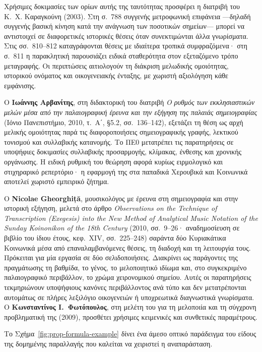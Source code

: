 \documentclass[11pt,a4paper]{article}
\begin{document}
Χρήσιμες δοκιμασίες των ορίων αυτής της ταυτότητας προσφέρει η διατριβή του Κ.~Χ. Καραγκούνη (2003). Στη σ.~788 συγγενής μετροφωνική επιφάνεια ---δηλαδή συγγενής βασική κίνηση κατά την ανάγνωση των ποσοτικών σημείων--- μπορεί να αντιστοιχεί σε διαφορετικές ιστορικές θέσεις όταν συνεκτιμώνται άλλα γνωρίσματα. Στις σσ.~810--812 καταγράφονται θέσεις με ιδιαίτερα τροπικά συμφραζόμενα· στη σ.~811 η παρακλητική παρουσιάζει ειδικά σταθερότητα στον εξεταζόμενο τρόπο μεταγραφής. Οι περιπτώσεις αιτιολογούν τη διάκριση μελωδικής ομοιότητας, ιστορικού ονόματος και οικογενειακής ένταξης, με χωριστή αξιολόγηση κάθε εμφάνισης.

Ο \textbf{Ιωάννης Αρβανίτης}, στη διδακτορική του διατριβή \emph{Ο ρυθμός των εκκλησιαστικών μελών μέσα από την παλαιογραφική έρευνα και την εξήγηση της παλαιάς σημειογραφίας} (Ιόνιο Πανεπιστήμιο, 2010, τ.~Α΄, §5.2, σσ.~136--142), εξετάζει τη θέση ως αρχή μελικής ομοιότητας παρά τις διαφοροποιήσεις σημειογραφικής γραφής, λεκτικού τονισμού και συλλαβικής κατανομής. Το ΠΕ0 μετατρέπει τις παρατηρήσεις σε υποψήφιες δοκιμασίες συλλαβικής προσαρμογής, κλίμακας, ένθεσης και χρονικής οργάνωσης. Η ειδική ρυθμική του θεώρηση αφορά κυρίως ειρμολογικό και στιχηραρικό ρεπερτόριο· η εφαρμογή της στα παπαδικά Χερουβικά και Κοινωνικά αποτελεί χωριστό εμπειρικό ζήτημα.

Ο \textbf{Nicolae Gheorghiță}, μουσικολόγος με έρευνα στη σημειογραφία και στην ιστορική εξήγηση, μελετά στο άρθρο \emph{Observations on the Technique of Transcription (Exegesis) into the New Method of Analytical Music Notation of the Sunday Koinonikon of the 18th Century} (2010, σσ.~9--26· αναδημοσίευση σε βιβλίο του ίδιου έτους, κεφ.~XIV, σσ.~225--248) σαράντα δύο Κυριακάτικα Κοινωνικά μέσα από επαναλαμβανόμενες θέσεις, τη διαδοχή και τη λειτουργία τους. Πρόκειται για μία εργασία σε δύο σελιδοποιήσεις. Διακρίνει ως παράγοντες της πραγμάτωσης τη βαθμίδα, το γένος, το μελοποιητικό ιδίωμα και, στο συγκεκριμένο παλαιογραφικό περιβάλλον, το χρώμα χειρονομικού σημείου. Αυτές οι παρατηρήσεις τεκμηριώνουν υποψήφιους κανόνες περιβάλλοντος ανά τύπο και δεν μετατρέπονται αυτομάτως σε πλήρες λεξιλόγιο οικογενειών ή υποχρεωτικά διαγνωστικά γνωρίσματα. Ο \textbf{Κωνσταντίνος Ι.~Φωτόπουλος}, στη μελέτη του για τη μελοποιία και τη σύγχρονη προβληματική της (2009), προσθέτει χρήσιμες κειμενικές και συνθετικές παραμέτρους.

Το Σχήμα~\ref{fig:prop-formula-example} δίνει ένα άμεσο οπτικό παράδειγμα του είδους της δομημένης παραλλαγής που καλείται να χειριστεί η αναπαράσταση.
\end{document}
